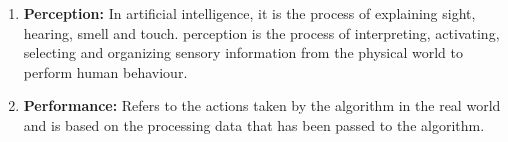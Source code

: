 \documentclass{article}
\begin{document}
\begin{enumerate}
	\item \textbf{Perception:} In artificial intelligence, it is the process of explaining sight, hearing, smell and touch. perception is the process of interpreting, activating, selecting and organizing sensory information from the physical world to perform human behaviour.

	\item \textbf{Performance:} Refers to the actions taken by the algorithm in the real world and is based on the processing data that has been passed to the algorithm.\end{enumerate}
	
\end{document}
